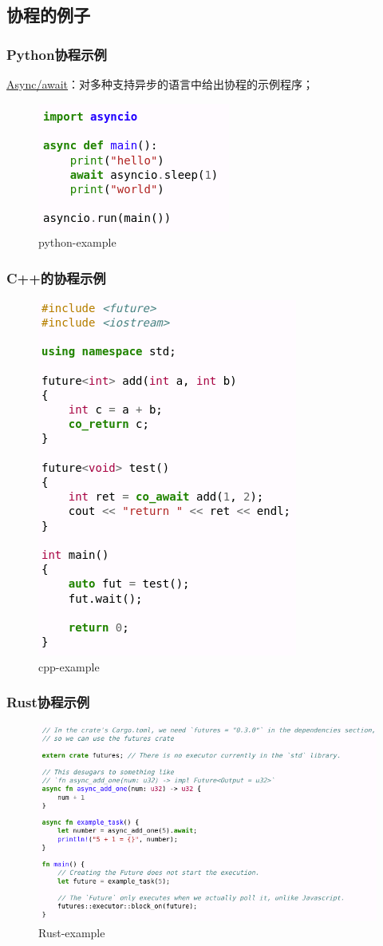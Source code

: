\subsection{协程的例子}
% 
\begin{frame}[fragile]
    \frametitle{Python协程示例}
% 
\href{https://en.wikipedia.org/wiki/Async/await}{Async/await}：对多种支持异步的语言中给出协程的示例程序；
% 
% 
% 
	\begin{figure}
		\centering
		\includegraphics[width=0.5\linewidth]{figs/python-example.png}
		\caption{python-example}
	\end{figure}


% 

\end{frame}
\begin{frame}[fragile]
    \frametitle{C++的协程示例}
% 
	\begin{figure}
		\centering
		\includegraphics[width=0.2\linewidth]{figs/cpp-example.png}
		\caption{cpp-example}
	\end{figure}


% 

\end{frame}
\begin{frame}[fragile]
    \frametitle{Rust协程示例}
% 
	\begin{figure}
		\centering
		\includegraphics[width=0.5\linewidth]{figs/Rust-example.png}
		\caption{Rust-example}
	\end{figure}

\end{frame}
% 
